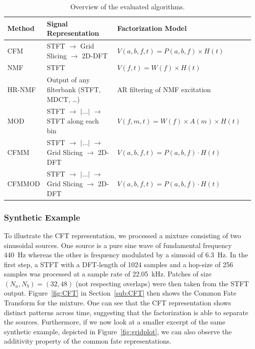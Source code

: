 \begin{table}[ht!]
  \centering
  \scriptsize
\begin{tabular}{ llll }
    \toprule
    Method & Signal Representation & Factorization Model \\
    \midrule
    CFM~\cite{stoter16} & \acs{STFT} $\rightarrow$ Grid Slicing $\rightarrow$ 2D-DFT & $V(a,b,f,t) = P(a,b,f)\times H(t)$ \\
    \acs{NMF}~\cite{virtanen07} & \acs{STFT} & $V(f,t) = W(f)\times H(t)$ \\
    HR-NMF~\cite{badeau13} & Output of any filterbank (\acs{STFT}, MDCT, \ldots)  & AR filtering of NMF excitation \\
    MOD~\cite{barker13} & \acs{STFT} $\rightarrow$ $|\ldots|$ $\rightarrow$ \acs{STFT} along each bin & $V(f,m,t) = W(f)\times A(m)\times H(t)$ \\
    CFMM & \acs{STFT} $\rightarrow$ $|\ldots|$ $\rightarrow$ Grid Slicing $\rightarrow$ 2D-DFT & $V(a,b,f,t) = P(a,b,f)\cdot H(t)$ \\
    CFMMOD & \acs{STFT} $\rightarrow$ $|\ldots|$ $\rightarrow$ Grid Slicing $\rightarrow$ 2D-DFT & $V(a,b,f,t) = P(a,b,f)\cdot H(t)$ \\
    \bottomrule
\end{tabular}
\caption{Overview of the evaluated algorithms.}
\label{tab:methods}
\end{table}

\subsubsection{Synthetic Example}
\label{sub:Synthentic_Examples}

To illustrate the CFT representation, we processed a mixture consisting of two sinusoidal sources. 
One source is a pure sine wave of fundamental frequency \SI{440}{\hertz} whereas the other is frequency modulated by a sinusoid of \SI{6.3}{\hertz}. 
In the first step, a \acs{STFT} with a DFT-length of 1024 samples and a hop-size of 256 samples was processed at a sample rate of 22.05~kHz. 
Patches of size $(N_a, N_b) = (32, 48)$ (not respecting overlaps) were then taken from the \acs{STFT} output. 
Figure~\ref{fig:CFT} in Section~\ref{sub:CFT} then shows the Common Fate Transform for the mixture. 
One can see that the CFT representation shows distinct patterns across time, suggesting that the factorization is able to separate the sources. 
Furthermore, if we now look at a smaller excerpt of the same synthetic example, depicted in Figure~\ref{fig:gridplot}, we can also observe the additivity property of the common fate representations.

